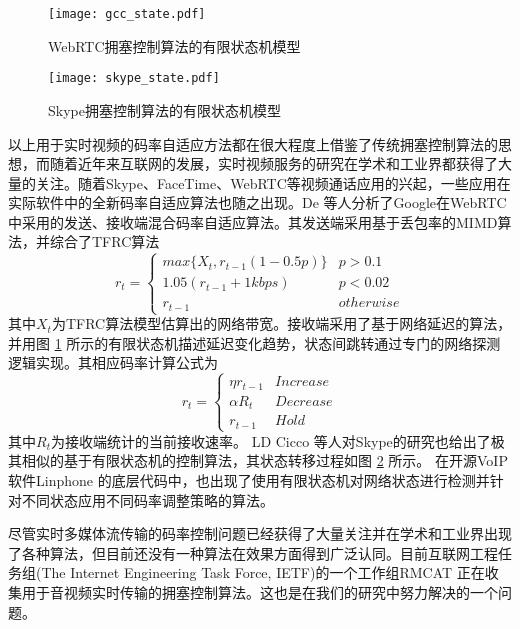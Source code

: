 \begin{figure}[htbp]
  \centering
  \texttt{[image: gcc\_state.pdf]}
  \caption{WebRTC拥塞控制算法的有限状态机模型}
  \label{fig:gcc_state}
\end{figure}

\begin{figure}[htbp]
  \centering
  \texttt{[image: skype\_state.pdf]}
  \caption{Skype拥塞控制算法的有限状态机模型}
  \label{fig:skype_state}
\end{figure}

以上用于实时视频的码率自适应方法都在很大程度上借鉴了传统拥塞控制算法的思想，而随着近年来互联网的发展，实时视频服务的研究在学术和工业界都获得了大量的关注。随着Skype、FaceTime、WebRTC等视频通话应用的兴起，一些应用在实际软件中的全新码率自适应算法也随之出现。De \cite{de2013experimental} 等人分析了Google在WebRTC中采用的发送、接收端混合码率自适应算法。其发送端采用基于丢包率的MIMD算法，并综合了TFRC算法
\begin{equation}
  r_t = \left\{ \begin{array}{ll}
    max\{X_t, r_{t-1}(1-0.5p)\} &   p > 0.1\\
    1.05(r_{t-1} + 1kbps)       &   p < 0.02\\
    r_{t-1}                     &   otherwise
  \end{array} \right.
\end{equation}
其中$X_t$为TFRC算法模型估算出的网络带宽。接收端采用了基于网络延迟的算法，并用图 \ref{fig:gcc_state} 所示的有限状态机描述延迟变化趋势，状态间跳转通过专门的网络探测逻辑实现。其相应码率计算公式为
\begin{equation}
  r_t = \left\{ \begin{array}{ll}
    \eta r_{t-1} &   Increase\\
    \alpha R_t   &   Decrease\\
    r_{t-1}      &   Hold
  \end{array} \right.
\end{equation}
其中$R_t$为接收端统计的当前接收速率。
LD Cicco \cite{cicco2010mathematical} 等人对Skype的研究也给出了极其相似的基于有限状态机的控制算法，其状态转移过程如图 \ref{fig:skype_state} 所示。
在开源VoIP软件Linphone \cite{website:linphone}的底层代码中，也出现了使用有限状态机对网络状态进行检测并针对不同状态应用不同码率调整策略的算法。

尽管实时多媒体流传输的码率控制问题已经获得了大量关注并在学术和工业界出现了各种算法，但目前还没有一种算法在效果方面得到广泛认同。目前互联网工程任务组(The Internet Engineering Task Force, IETF)的一个工作组RMCAT \cite{website:rmcat} 正在收集用于音视频实时传输的拥塞控制算法。这也是在我们的研究中努力解决的一个问题。


